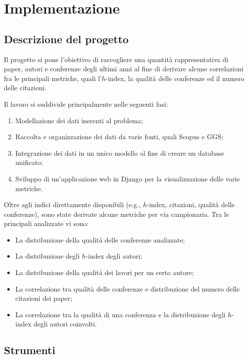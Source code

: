 \chapter{Implementazione}

\section{Descrizione del progetto}
\label{descrizione_progetto}

Il progetto si pone l'obiettivo di raccogliere una quantità rappresentativa
di paper, autori e conferenze degli ultimi anni al fine di derivare alcune
correlazioni fra le principali metriche, quali l'$h$-index, la qualità delle
conferenze ed il numero delle citazioni.

Il lavoro si suddivide principalmente nelle seguenti fasi:
\begin{enumerate}
  \item Modellazione dei dati inerenti al problema;
  \item Raccolta e organizzazione dei dati da varie fonti, quali Scopus e GGS;
  \item Integrazione dei dati in un unico modello al fine di creare un database unificato;
  \item Sviluppo di un'applicazione web in Django per la visualizzazione delle varie metriche.
\end{enumerate}

Oltre agli indici direttamente disponibili (e.g., $h$-index, citazioni, qualità
delle conferenze), sono state derivate alcune metriche per via campionaria.
Tra le principali analizzate vi sono:
\begin{itemize}
  \item La distribuzione della qualità delle conferenze analizzate;
  \item La distribuzione degli $h$-index degli autori;
  \item La distribuzione della qualità dei lavori per un certo autore;
  \item La correlazione tra qualità delle conferenze e distribuzione del numero delle citazioni dei paper;
  \item La correlazione tra la qualità di una conferenza e la distribuzione degli $h$-index degli autori coinvolti.
\end{itemize}

\section{Strumenti}

